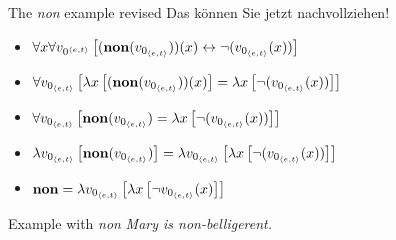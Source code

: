 \begin{frame}
  {The \emph{non} example revised \citep[104]{DowtyEa1981}}
  \onslide<+->
  \onslide<+->
  Das können Sie jetzt nachvollziehen!\\
  \Zeile
  \begin{itemize}[<+->]
    \item[~~~] $\forall{}x\forall{}v_{0^{{\langle{}e,t\rangle}}}\left[{}(\mathbf{non}(v_{0_{{\langle{}e,t\rangle}}}))(x)\leftrightarrow\neg{}(v_{0_{{\langle{}e,t\rangle}}}(x))\right]$
    \item[$\vdash$~~] $\forall{}v_{0_{{\langle{}e,t\rangle}}}\left[{}\lambda{}x\left[{}(\mathbf{non}(v_{0_{{\langle{}e,t\rangle}}}))(x)\right]=\lambda{}x\left[{}\neg{}(v_{0_{{\langle{}e,t\rangle}}}(x))\right]\right]$
    \item[$\equiv$~~] $\forall{}v_{0_{{\langle{}e,t\rangle}}}\left[{}\mathbf{non}(v_{0_{{\langle{}e,t\rangle}}})=\lambda{}x\left[{}\neg{}(v_{0_{{\langle{}e,t\rangle}}}(x))\right]\right]$
    \item[$\vdash$~~] $\lambda{}v_{0_{{\langle{}e,t\rangle}}}\left[{}\mathbf{non}(v_{0_{{\langle{}e,t\rangle}}})\right]=\lambda{}v_{0_{{\langle{}e,t\rangle}}}\left[{}\lambda{}x\left[{}\neg{}(v_{0_{{\langle{}e,t\rangle}}}(x))\right]\right]$
    \item[$\equiv$~~] $\mathbf{non}=\lambda{}v_{0_{{\langle{}e,t\rangle}}}\left[{}\lambda{x}\left[{}\neg{}v_{0_{{\langle{}e,t\rangle}}}(x)\right]\right]$
  \end{itemize}
\end{frame}

\begin{frame}
  {Example with \textit{non}}
  \onslide<+->
  \onslide<+->
  \textit{Mary is non-belligerent.}\\
  \Viertelzeile
  \\
  \onslide<+->
  \Zeile
  \centering 
\end{frame}


